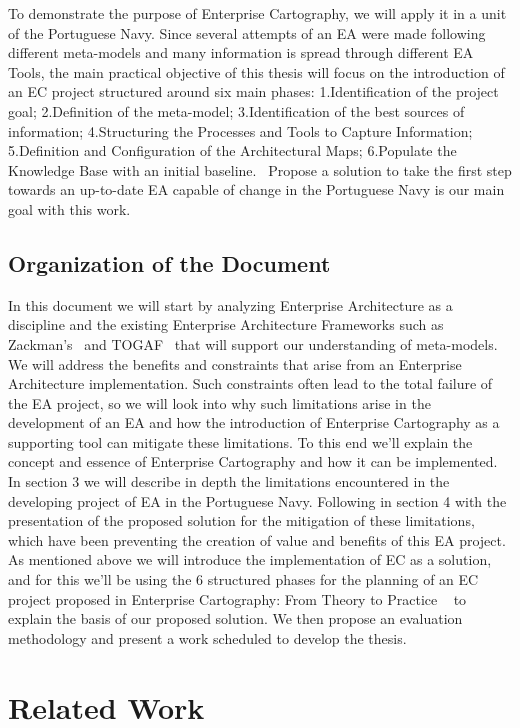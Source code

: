 \documentclass[runningheads]{llncs}
\begin{document}
To demonstrate the purpose of Enterprise Cartography, we will apply it in a unit of the Portuguese Navy.
Since several attempts of an EA were made following different meta-models and many information is spread through different EA Tools, the main practical objective of this thesis will focus on the introduction of an EC project structured around six main phases: 1.Identification of the project goal; 2.Definition of the meta-model; 3.Identification of the best sources of information; 4.Structuring the Processes and Tools to Capture Information; 5.Definition and Configuration of the Architectural Maps; 6.Populate the Knowledge Base with an initial baseline.~\cite{ref_5}
Propose a solution to take the first step towards an up-to-date EA capable of change in the Portuguese Navy is our main goal with this work.


\subsection{Organization of the Document} 
In this document we will start by analyzing Enterprise Architecture as a discipline and the existing Enterprise Architecture Frameworks such as Zackman's~\cite{ref_1} and TOGAF~\cite{ref_book1} that will support our understanding of meta-models. 
We will address the benefits and constraints that arise from an Enterprise Architecture implementation. Such constraints often lead to the total failure of the EA project, so we will look into why such limitations arise in the development of an EA and how the introduction of  Enterprise Cartography as a supporting tool can mitigate these limitations. To this end we'll explain the concept and essence of Enterprise Cartography and how it can be implemented.
In section 3 we will describe in depth the limitations encountered in the developing project of EA in the Portuguese Navy. Following in section 4 with the presentation of the proposed solution for the mitigation of these limitations, which have been preventing the creation of value and benefits of this EA project. As mentioned above we will introduce the implementation of EC as a solution, and for this we'll be using the 6 structured phases for the planning of an EC project proposed in  Enterprise Cartography: From Theory to Practice ~\cite{ref_5} to explain the basis of our proposed solution.
We then propose an evaluation methodology and present a work scheduled to develop the thesis.


\section{Related Work}
\end{document}

